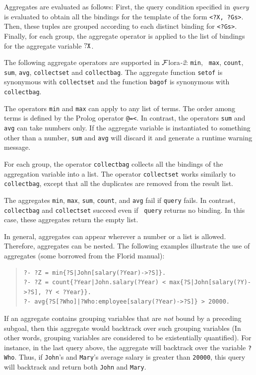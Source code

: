 \documentclass[11pt]{article}
\newcommand{\FLORA}{{\mbox{\sc ${\cal F}${lora}\rm\emph{-2}}}\xspace}
\newcommand{\FLORID}{{\mbox{\sc Florid}}\xspace}
\begin{document}
Aggregates are evaluated as follows: First, the query
condition specified in {\it query} is evaluated to obtain all the bindings
for the template of the form {\tt \texttt{<}?X, ?Gs\texttt{>}}. Then, these
tuples are grouped according to each distinct binding for
{\tt \texttt{<}?Gs\texttt{>}}. Finally, for each group, the aggregate operator
is applied to the list of bindings for the aggregate variable $\tt ?X$.


%
The following aggregate operators are supported in \FLORA: {\tt min}, {\tt
  max}, {\tt count}, {\tt sum}, {\tt avg}, {\tt collectset}
  and {\tt collectbag}. The aggregate
function {\tt setof} is synonymous with
{\tt collectset} and the function {\tt bagof} is synonymous with {\tt
  collectbag}.

The operators {\tt min} and {\tt max} can apply to any list of
terms. The order among terms is defined by the Prolog operator {\tt @=<}.  In
contrast, the operators {\tt sum} and {\tt avg} can take numbers only. If
the aggregate variable is instantiated to something other than a
number, {\tt sum} and {\tt avg} will discard it and generate a runtime
warning message.

For each group, the operator {\tt collectbag} collects all the bindings of
the aggregation variable into a list. The operator {\tt collectset} works
similarly to {\tt collectbag}, except that all the duplicates are removed
from the result list.


The aggregates {\tt min}, {\tt max}, {\tt sum}, {\tt count}, and {\tt avg}
fail if {\tt query} fails.
In contrast, {\tt collectbag} and {\tt collectset} succeed even if {\tt
  query} returns no binding. In this case, these aggregates return the
empty list.

In general, aggregates can appear wherever a number or a list is
allowed. Therefore, aggregates can be nested. The following examples
illustrate the use of aggregates (some borrowed from the \FLORID manual):
\begin{quote}
\begin{verbatim}
?- ?Z = min{?S|John[salary(?Year)->?S]}.
?- ?Z = count{?Year|John.salary(?Year) < max{?S|John[salary(?Y)->?S], ?Y < ?Year}}.
?- avg{?S[?Who]|?Who:employee[salary(?Year)->?S]} > 20000. 
\end{verbatim}
\end{quote}
If an aggregate contains grouping variables that are \emph{not} bound
by a preceding subgoal, then this aggregate would backtrack over such
grouping variables (In other words, grouping variables are considered to be
existentially quantified). For instance, in the last query above, the
aggregate will backtrack over the variable {\tt ?Who}. Thus, if
{\tt John}'s and {\tt Mary}'s average salary is greater than {\tt 20000},
this query will backtrack and return both {\tt John} and {\tt Mary}.
\end{document}
